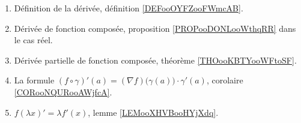 \begin{enumerate}
	\item
	      Définition de la dérivée, définition \ref{DEFooOYFZooFWmcAB}.
	\item
	      Dérivée de fonction composée, proposition \ref{PROPooDONLooWthqRR} dans le cas réel.
	\item
	      Dérivée partielle de fonction composée, théorème \ref{THOooKBTYooWFtoSF}.
	\item
	      La formule \( (f\circ \gamma)'(a)=(\nabla f)\big( \gamma(a) \big)\cdot \gamma'(a)\), corolaire \ref{CORooNQURooAWjfcA}.
	\item
	      \( f(\lambda x)'=\lambda f'(x)\), lemme \ref{LEMooXHVBooHYjXdq}.
\end{enumerate}
